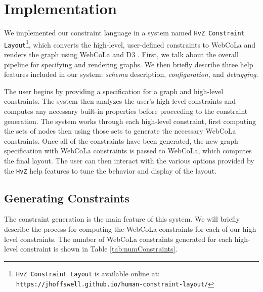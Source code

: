 \section{Implementation}
We implemented our constraint language in a system named \texttt{HvZ Constraint Layout}\footnote{\texttt{HvZ Constraint Layout} is available online at:\\ \texttt{https://jhoffswell.github.io/human-constraint-layout/}}, which converts the high-level, user-defined constraints to WebCoLa \cite{WebCoLa} and renders the graph using WebCoLa and D3 \cite{bostock:d3}. First, we talk about the overall pipeline for specifying and rendering graphs. We then briefly describe three help features included in our system: \emph{schema} description, \emph{configuration}, and \emph{debugging}.

The user begins by providing a specification for a graph and high-level constraints. The system then analyzes the user's high-level constraints and computes any necessary built-in properties before proceeding to the constraint generation. The system works through each high-level constraint, first computing the sets of nodes then using those sets to generate the necessary WebCoLa constraints. Once all of the constraints have been generated, the new graph specification with WebCoLa constraints is passed to WebCoLa, which computes the final layout. The user can then interact with the various options provided by the \texttt{HvZ} help features to tune the behavior and display of the layout.

\subsection{Generating Constraints}
The constraint generation is the main feature of this system. We will briefly describe the process for computing the WebCoLa constraints for each of our high-level constraints. The number of WebCoLa constraints generated for each high-level constraint is shown in Table \ref{tab:numConstraints}.

\newcommand{\nodePairs}{$\sum\limits_{i=1}^s n_i * \sum\limits_{j=i+1}^s n_j$}
\newcommand{\nodeInSets}{$\sum\limits_{i=1}^s n_i$}
\newcommand{\inSetPairs}{$\sum\limits_{i=1}^s {n_i \choose 2}$}

